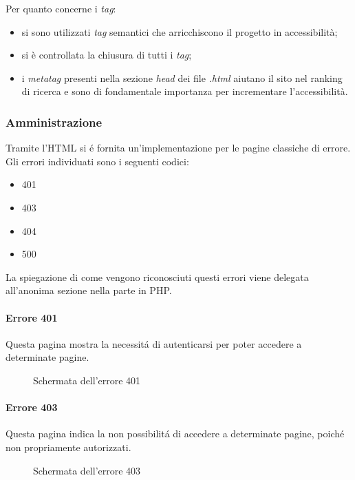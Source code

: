 \documentclass{article}
\begin{document}
Per quanto concerne i \textit{tag}:
\begin{itemize}
	\item si sono utilizzati \textit{tag} semantici che arricchiscono il progetto in accessibilità;
	\item si è controllata la chiusura di tutti i \textit{tag};
	\item i \textit{metatag} presenti nella sezione \textit{head} dei file \textit{.html} aiutano il sito nel ranking di ricerca e sono di fondamentale importanza per incrementare l'accessibilità.
\end{itemize}

\subsubsection{Amministrazione}
Tramite l'HTML si é fornita un'implementazione per le pagine classiche di errore.\\
Gli errori individuati sono i seguenti codici:
\begin{itemize}
	\item 401
	\item 403
	\item 404
	\item 500
\end{itemize}
La spiegazione di come vengono riconosciuti questi errori viene delegata all'anonima sezione nella parte in PHP.
\paragraph*{Errore 401}
Questa pagina mostra la necessitá di autenticarsi per poter accedere a determinate pagine.
\begin{figure}[H]
	\centering
	\caption{Schermata dell'errore 401}
\end{figure}
\paragraph*{Errore 403}
Questa pagina indica la non possibilitá di accedere a determinate pagine, poiché non propriamente autorizzati.
\begin{figure}[H]
	\centering
	\caption{Schermata dell'errore 403}
\end{figure}
\end{document}
